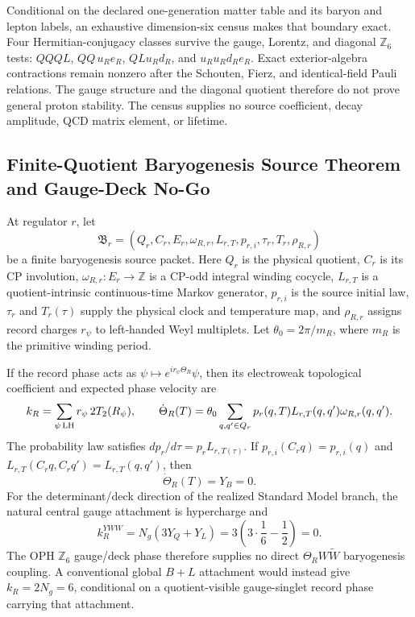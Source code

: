 Conditional on the declared one-generation matter table and its baryon and
lepton labels, an exhaustive dimension-six census makes that boundary exact.
Four Hermitian-conjugacy classes survive the gauge, Lorentz, and diagonal
\(\mathbb Z_6\) tests:
\(QQQL\), \(QQ\,u_Re_R\), \(QLu_Rd_R\), and \(u_Ru_Rd_Re_R\).
Exact exterior-algebra contractions remain nonzero after the Schouten, Fierz,
and identical-field Pauli relations. The gauge structure and the diagonal
quotient therefore do not prove general proton stability. The census supplies
no source coefficient, decay amplitude, QCD matrix element, or lifetime.

\subsection{Finite-Quotient Baryogenesis Source Theorem and Gauge-Deck No-Go}
\label{app:baryogenesis-source-theorem}

At regulator \(r\), let
\[
\mathfrak B_r=(Q_r,C_r,E_r,\omega_{R,r},L_{r,T},p_{r,i},
\tau_r,T_r,\rho_{R,r})
\]
be a finite baryogenesis source packet. Here \(Q_r\) is the physical quotient,
\(C_r\) is its CP involution, \(\omega_{R,r}:E_r\to\mathbb Z\) is a CP-odd
integral winding cocycle, \(L_{r,T}\) is a quotient-intrinsic continuous-time
Markov generator, \(p_{r,i}\) is the source initial law, \(\tau_r\) and
\(T_r(\tau)\) supply the physical clock and temperature map, and
\(\rho_{R,r}\) assigns record charges \(r_\psi\) to left-handed Weyl
multiplets. Let \(\theta_0=2\pi/m_R\), where \(m_R\) is the primitive winding
period.

\begin{theorem}
\label{thm:finite-baryogenesis-source}
If the record phase acts as
\(\psi\mapsto e^{ir_\psi\Theta_R}\psi\), then its electroweak topological
coefficient and expected phase velocity are
\[
k_R=\sum_{\psi\,{\rm LH}}r_\psi\,2T_2(R_\psi),
\qquad
\dot\Theta_R(T)=\theta_0
\sum_{q,q'\in Q_r}p_r(q,T)L_{r,T}(q,q')\omega_{R,r}(q,q').
\]
The probability law satisfies \(dp_r/d\tau=p_rL_{r,T(\tau)}\). If
\(p_{r,i}(C_rq)=p_{r,i}(q)\) and
\(L_{r,T}(C_rq,C_rq')=L_{r,T}(q,q')\), then
\[
\dot\Theta_R(T)=Y_B=0.
\]
For the determinant/deck direction of the realized Standard Model branch,
the natural central gauge attachment is hypercharge and
\[
k_R^{YWW}=N_g(3Y_Q+Y_L)
=3\left(3\cdot\frac16-\frac12\right)=0.
\]
The OPH \(\mathbb Z_6\) gauge/deck phase therefore supplies no direct
\(\Theta_R W\widetilde W\) baryogenesis coupling. A conventional global
\(B+L\) attachment would instead give \(k_R=2N_g=6\), conditional on a
quotient-visible gauge-singlet record phase carrying that attachment.
\end{theorem}

